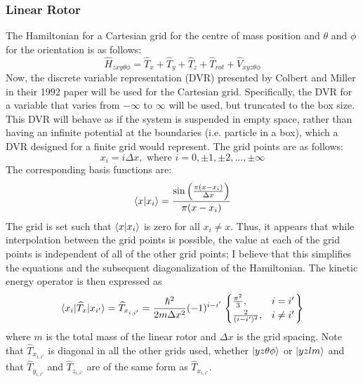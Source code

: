 \documentclass{revtex4-1}
\begin{document}
\subsubsection{Linear Rotor}\label{S:LinRotH}
The Hamiltonian for a Cartesian grid for the centre of mass position and $\theta$ and $\phi$ for the orientation is as follows:
\begin{equation}
\widehat{H}_{zxy\theta\phi} = \widehat{T}_{x} + \widehat{T}_{y} + \widehat{T}_{z} + \widehat{T}_{rot} + \widehat{V}_{xyz\theta\phi} 
\end{equation}
Now, the discrete variable representation (DVR) presented by Colbert and Miller in their 1992 paper will be used for the Cartesian grid. Specifically, the DVR for a variable that varies from $-\infty$ to $\infty$ will be used, but truncated to the box size. This DVR will behave as if the system is suspended in empty space, rather than having an infinite potential at the boundaries (i.e. particle in a box), which a DVR designed for a finite grid would represent.
The grid points are as follows:
\begin{equation}
x_{i} = i\Delta x, \text{ where } i = 0, \pm 1, \pm 2, ..., \pm \infty
\end{equation}
The corresponding basis functions are:
\begin{equation}
\braket{x|x_{i}} = \frac{\sin \left(\frac{\pi(x-x_{i})}{\Delta x}\right)}{\pi(x-x_{i})}
\end{equation}
The grid is set such that $\braket{x|x_{i}}$ is zero for all $x_{i}\neq x$. Thus, it appears that while interpolation between the grid points is possible, the value at each of the grid points is independent of all of the other grid points; I believe that this simplifies the equations and the subsequent diagonalization of the Hamiltonian. The kinetic energy operator is then expressed as 
\begin{equation}
\braket{x_{i}|\widehat{T}_{x}|x_{i'}}=\widehat{T}_{x_{i,i'}}=\frac{\hbar^{2}}{2m\Delta x^{2}} (-1)^{i-i'} \left.\begin{cases} \frac{\pi^{2}}{3}, & i=i'\\
																			    \frac{2}{(i-i')^{2}}, &i\neq i'
																			    \end{cases}\right\}
\end{equation}
where $m$ is the total mass of the linear rotor and $\Delta x$ is the grid spacing.
Note that $\widehat{T}_{x_{i,i'}}$ is diagonal in all the other grids used, whether $\ket{yz\theta\phi}$ or $\ket{yzlm}$ and that $\widehat{T}_{y_{i,i'}}$ and $\widehat{T}_{z_{i,i'}}$ are of the same form as $\widehat{T}_{x_{i,i'}}$.
\end{document}
